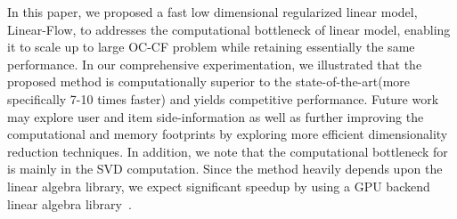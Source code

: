
In this paper, we proposed a fast low dimensional regularized linear model, Linear-Flow, to addresses the computational bottleneck of linear model, enabling it to scale up to large OC-CF problem while retaining essentially the same performance. In our comprehensive experimentation, we illustrated that the proposed method is computationally superior to the state-of-the-art(more specifically 7-10 times faster) and yields competitive performance. Future work may explore user and item side-information as well as further improving the computational and memory footprints by exploring more efficient dimensionality reduction techniques. 
In addition, we note that the computational bottleneck for \LinearLow is mainly in the SVD computation. Since the method heavily depends upon the linear algebra library, we expect significant speedup by using a GPU backend linear algebra library~\citep{Voronin:GPURSVD}. 

